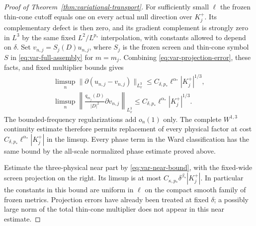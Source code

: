 \documentclass[11pt,a4paper]{article}
\numberwithin{equation}{section}
\newcommand{\f}[2]{\frac{#1}{#2}}
\theoremstyle{definition}
\begin{document}
\begin{proof}[Proof of Theorem~\ref{thm:variational-transport}]
For sufficiently small $\ell$ the frozen thin-cone cutoff equals one
on every actual null direction over $K_j^+$. Its complementary defect
is then zero, and its gradient complement is strongly zero in $L^3$
by the same fixed $L^2/L^{p_*}$ interpolation, with constants allowed to
depend on $\delta$. Set $v_{n,j}=S_j(D)u_{n,j}$, where $S_j$ is the frozen screen and
thin-cone symbol $S$ in \eqref{eq:var-full-assembly} for $m=m_j$.
Combining
\eqref{eq:var-projection-error}, these facts, and fixed
multiplier bounds gives
\begin{equation*}
\begin{gathered}
\limsup_n\|\partial(u_{n,j}-v_{n,j})\|_{L^3_x}
\leq C_{\delta,p_*}\ell^{\alpha_*}|K_j^+|^{1/3},\\
\limsup_n\left\|\f{q_{m_j}(D)}{|D|^2}
                            \partial v_{n,j}\right\|_{L^3_x}
\leq C_{\delta,p_*}\ell^{\alpha_*}|K_j^+|^{1/3}.
\end{gathered}
\end{equation*}
The bounded-frequency regularizations add $o_n(1)$ only. The complete
$W^{1,3}$ continuity estimate therefore permits replacement of every
physical factor at cost $C_{\delta,p_*}\ell^{\alpha_*}|K_j^+|$ in the limsup.
Every phase term in the Ward classification has the same bound by
the all-scale normalized phase estimate proved above.

Estimate the three-physical near part by
\eqref{eq:var-near-bound}, with the fixed-wide screen projection on
the right. Its limsup is at most
$C_{\kappa,p_*}\delta^{\beta_*}|K_j^+|$. In particular the constants in this
bound are uniform in $\ell$ on the compact smooth family of frozen
metrics. Projection errors have already been treated at fixed
$\delta$; a possibly large norm of the total thin-cone multiplier
does not appear in this near estimate.


\end{proof}
\end{document}
